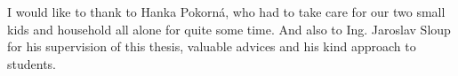 
\acknowledgements
\noindent

I would like to thank to Hanka Pokorná, who had to take care for our two small kids and household all alone for quite some time. And also to Ing. Jaroslav Sloup for his supervision of this thesis, valuable advices and his kind approach to students.
